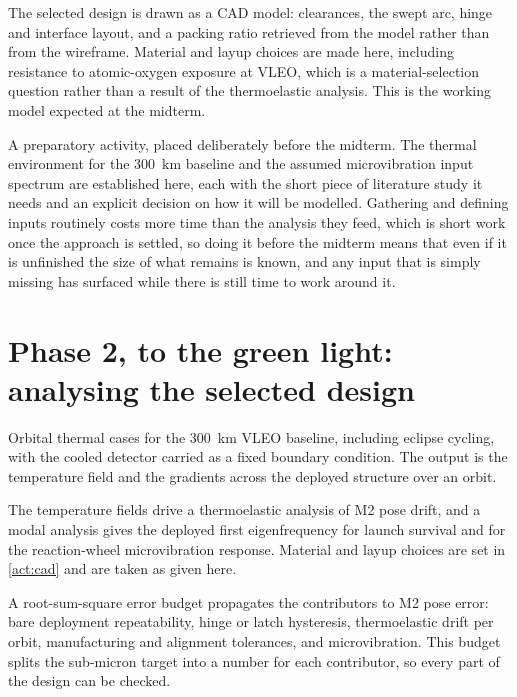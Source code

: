  The selected design is drawn as a CAD model: clearances, the swept arc, hinge and interface layout, and a packing ratio retrieved from the model rather than from the wireframe. Material and layup choices are made here, including resistance to atomic-oxygen exposure at VLEO, which is a material-selection question rather than a result of the thermoelastic analysis. This is the working model expected at the midterm.

 A preparatory activity, placed deliberately before the midterm. The thermal environment for the \SI{300}{\kilo\meter} baseline and the assumed microvibration input spectrum are established here, each with the short piece of literature study it needs and an explicit decision on how it will be modelled. Gathering and defining inputs routinely costs more time than the analysis they feed, which is short work once the approach is settled, so doing it before the midterm means that even if it is unfinished the size of what remains is known, and any input that is simply missing has surfaced while there is still time to work around it.

\section{Phase 2, to the green light: analysing the selected design}
\label{sec:phase2}

 Orbital thermal cases for the \SI{300}{\kilo\meter} VLEO baseline, including eclipse cycling, with the cooled detector carried as a fixed boundary condition. The output is the temperature field and the gradients across the deployed structure over an orbit.

 The temperature fields drive a thermoelastic analysis of M2 pose drift, and a modal analysis gives the deployed first eigenfrequency for launch survival and for the reaction-wheel microvibration response. Material and layup choices are set in \cref{act:cad} and are taken as given here.

 A root-sum-square error budget propagates the contributors to M2 pose error: bare deployment repeatability, hinge or latch hysteresis, thermoelastic drift per orbit, manufacturing and alignment tolerances, and microvibration. This budget splits the sub-micron target into a number for each contributor, so every part of the design can be checked.

